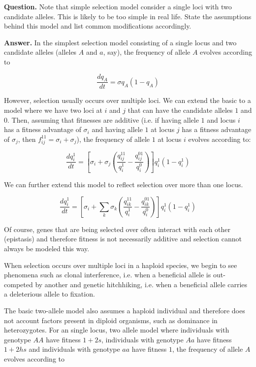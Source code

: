 \item \textbf{Question.} Note that simple selection model consider a single loci with two candidate alleles. This is likely to be too simple in real life. State the assumptions behind this model and list common modifications accordingly.

\textbf{Answer.} In the simplest selection model consisting of a single locus and two candidate alleles (alleles $A$ and $a$, say), the frequency of allele $A$ evolves according to 

\[\frac{dq_A}{dt} = \sigma q_A (1-q_A)\]

However, selection usually occurs over multiple loci. We can extend the basic to a model where we have two loci at $i$ and $j$ that can have the candidate alleles $1$ and $0$. Then, assuming that fitnesses are additive (i.e. if having allele $1$ and locus $i$ has a fitness advantage of $\sigma_i$ and having allele $1$ at locus $j$ has a fitness advantage of $\sigma_j$, then $f_{ij}^{11} = \sigma_i+\sigma_j$), the frequency of allele $1$ at locus $i$ evolves according to:

\[\frac{dq_i^1}{dt} = \left[\sigma_i + \sigma_j\left(\frac{q_{ij}^{11}}{q_i^1} - \frac{q_{ij}^{01}}{q_i^0}\right)\right]q_i^1(1-q_i^1)\] 

We can further extend this model to reflect selection over more than one locus. 

\[\frac{dq_i^1}{dt} = \left[\sigma_i + \sum_{k}{\sigma_k\left(\frac{q_{ik}^{11}}{q_i^1} - \frac{q_{ik}^{01}}{q_i^0}\right)}\right]q_i^1(1-q_i^1)\] 

Of course, genes that are being selected over often interact with each other (epistasis) and therefore fitness is not necessarily additive and selection cannot always be modeled this way. 

When selection occurs over multiple loci in a haploid species, we begin to see phenomena such as clonal interference, i.e. when a beneficial allele is out-competed by another and genetic hitchhiking, i.e. when a beneficial allele carries a deleterious allele to fixation. 

The basic two-allele model also assumes a haploid individual and therefore does not account factors present in diploid organisms, such as dominance in heterozygotes. For an single locus, two allele model where individuals with genotype $AA$ have fitness $1 + 2s$, individuals with genotype $Aa$ have fitness $1+2hs$ and individuals with genotype $aa$ have fitness $1$, the frequency of allele $A$ evolves according to 


